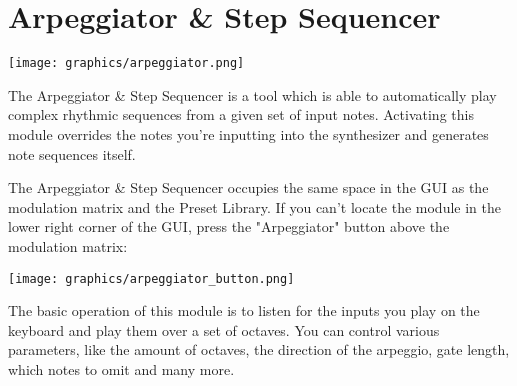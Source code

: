 \chapter{Arpeggiator \& Step Sequencer}
\label{arpeggiator}

\begin{center}
    \texttt{[image: graphics/arpeggiator.png]}
\end{center}

The Arpeggiator \& Step Sequencer is a tool which is able to automatically play complex rhythmic sequences from a given set of input notes. Activating this module overrides the notes you're inputting into the synthesizer and generates note sequences itself.

\begin{tcolorbox}[colback=yellow!10!white,
    colframe=white!20!black,
    center,
    valign=top,
    halign=left,
    center title,
    width=\textwidth]

    The Arpeggiator \& Step Sequencer occupies the same space in the GUI as the modulation matrix and the Preset Library. If you can't locate the module in the lower right corner of the GUI, press the "Arpeggiator" button above the modulation matrix:

    \begin{center}
        \texttt{[image: graphics/arpeggiator\_button.png]}
    \end{center}
\end{tcolorbox}

The basic operation of this module is to listen for the inputs you play on the keyboard and play them over a set of octaves. You can control various parameters, like the amount of octaves, the direction of the arpeggio, gate length, which notes to omit and many more.



